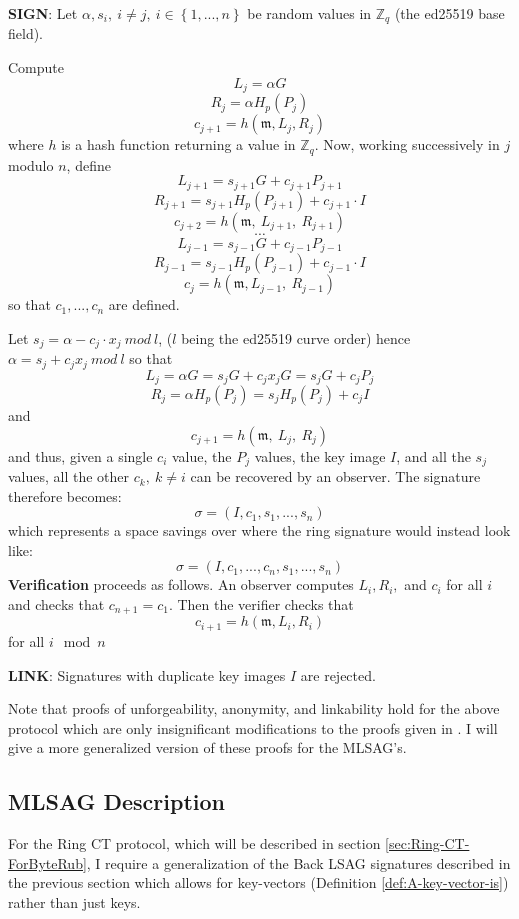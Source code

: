 \documentclass[12pt,english]{mrl}
\theoremstyle{definition}
\numberwithin{equation}{section}
\numberwithin{figure}{section}
\numberwithin{equation}{section}
\numberwithin{equation}{section}
\numberwithin{figure}{section}
\begin{document}
\textbf{SIGN}: Let $\alpha,s_{i},\ i\neq j,\ i\in\left\{ 1,...,n\right\} $
be random values in $\mathbb{Z}_{q}$ (the ed25519 base field). 

Compute
\[
L_{j}=\alpha G
\]
\[
R_{j}=\alpha H_p\left(P_{j}\right)
\]
\[
c_{j+1}=h\left(\mathfrak{m},L_{j},R_{j}\right)
\]
 where $h$ is a hash function returning a value in $\mathbb{Z}_{q}$.
Now, working successively in $j$ modulo $n$, define 
\[
L_{j+1}=s_{j+1}G+c_{j+1}P_{j+1}
\]
\[
R_{j+1}=s_{j+1}H_p\left(P_{j+1}\right)+c_{j+1}\cdot I
\]
\[
c_{j+2}=h\left(\mathfrak{m},\ L_{j+1},\ R_{j+1}\right)
\]
\[
\cdots
\]
\[
L_{j-1}=s_{j-1}G+c_{j-1}P_{j-1}
\]
\[
R_{j-1}=s_{j-1}H_p\left(P_{j-1}\right)+c_{j-1}\cdot I
\]
\[
c_{j}=h\left(\mathfrak{m},L_{j-1},\ R_{j-1}\right)
\]
 so that $c_{1},...,c_{n}$ are defined. 

Let $s_{j}=\alpha-c_{j}\cdot x_j\ mod\ l$, ($l$ being the ed25519
curve order) hence $\alpha=s_{j}+c_{j}x_j\ mod\ l$ so that 
\[
L_{j}=\alpha G=s_{j}G+c_{j}x_jG=s_{j}G+c_{j}P_{j}
\]
\[
R_{j}=\alpha 
H_p\left(P_{j}\right)=s_{j}H_p\left(P_{j}\right)+c_{j}I
\]
and 
\[
c_{j+1}=h\left(\mathfrak{m},\ L_{j},\ R_{j}\right)
\]
 and thus, given a single $c_{i}$ value, the $P_{j}$ values, the
key image $I$, and all the $s_{j}$ values, all the other $c_{k},\ k\neq i$
can be recovered by an observer. The signature therefore becomes:
\[
\sigma=\left(I,c_{1},s_{1},...,s_{n}\right)
\]
 which represents a space savings over \cite[4.4]{CN} where the ring signature would instead look like: 
 \[
\sigma=\left(I,c_{1}, ..., c_{n},s_{1},...,s_{n}\right)
\]
\textbf{Verification }proceeds as follows. An observer computes $L_{i},R_{i},$
and $c_{i}$ for all $i$ and checks that $c_{n+1}=c_{1}$. Then the
verifier checks that 
\[
c_{i+1}=h\left(\mathfrak{m},L_{i},R_{i}\right)
\]
 for all $i\mod n$ 

\textbf{LINK}: Signatures with duplicate key images $I$ are rejected. 

Note that proofs of unforgeability, anonymity, and linkability
hold for the above protocol which are only insignificant modifications to the proofs
given in \cite{LWW}. I will give a more generalized version of these
proofs for the MLSAG's. 
\subsection{\label{sub:MLSAG-Description}MLSAG Description}


For the Ring CT protocol, which will be described in section
\ref{sec:Ring-CT-ForByteRub}, I require a generalization of the Back
LSAG signatures described in the previous section which allows for key-vectors (Definition
\ref{def:A-key-vector-is}) rather than just keys. 
\end{document}
